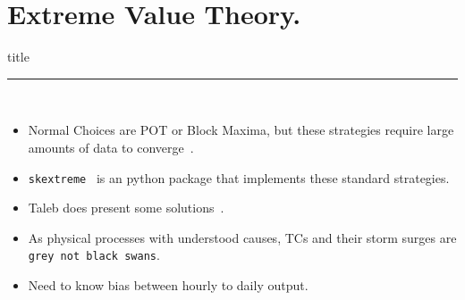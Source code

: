 \section{Extreme Value Theory. }
\begin{frame}[plain]
        \vfill
      \centering
      \begin{beamercolorbox}[sep=8pt,center,shadow=true,rounded=true]{title}
        \insertsectionhead\par%
        \color{oxfordblue}\noindent\rule{10cm}{1pt} \\
        \begin{itemize}
        \item Normal Choices are POT or Block Maxima, but these strategies require
              large amounts of data to converge~\cite{taleb2019much}.
        \item \texttt{skextreme}~\cite{skextremes} is an python package that implements these
              standard strategies.
        \item Taleb does present some solutions~\cite{taleb2019statistical}.
        \item As physical processes with understood causes, TCs
              and their storm surges are \texttt{grey not black swans}.
        \item Need to know bias between hourly to daily output.
        \end{itemize}
      \end{beamercolorbox}
      \vfill
\end{frame}


